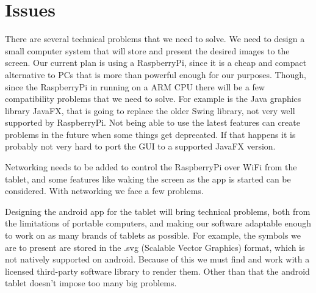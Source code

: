 \documentclass[12pt,a4paper,notitlepage]{report}
\begin{document}




\section{Issues}

There are several technical problems that we need to solve. We need to design a small computer system that will store and present the desired images to the screen. Our current plan is using a RaspberryPi, since it is a cheap and compact alternative to PCs that is more than powerful enough for our purposes. Though, since the RaspberryPi in running on a ARM CPU there will be a few compatibility problems that we need to solve. For example is the Java graphics library JavaFX, that is going to replace the older Swing library, not very well supported by RaspberryPi. Not being able to use the latest features can create problems in the future when some things get deprecated. If that happens it is probably not very hard to port the GUI to a supported JavaFX version.

Networking needs to be added to control the RaspberryPi over WiFi from the tablet, and some features like waking the screen as the app is started can be considered. With networking we face a few problems. %

Designing the android app for the tablet will bring technical problems, both from the limitations of portable computers, and making our software adaptable enough to work on as many brands of tablets as possible. For example, the symbols we are to present are stored in the .svg (Scalable Vector Graphics) format, which is not natively supported on android. Because of this we must find and work with a licensed third-party software library to render them. Other than that the android tablet doesn't impose too many big problems. %
\end{document}
